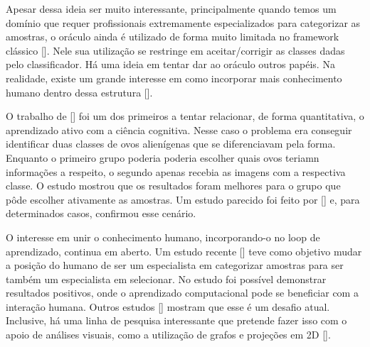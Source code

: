 Apesar dessa ideia ser muito interessante, principalmente quando temos um domínio que requer profissionais extremamente especializados para categorizar as amostras, o oráculo ainda é utilizado de forma muito limitada no framework clássico [\cite{seifert2010user}]. Nele sua utilização se restringe em aceitar/corrigir as classes dadas pelo classificador. Há uma ideia em tentar dar ao oráculo outros papéis. Na realidade, existe um grande interesse em como incorporar mais conhecimento humano dentro dessa estrutura [\cite{settles2014active}]. 

O trabalho de [\cite{castro2009human}] foi um dos primeiros a tentar relacionar, de forma quantitativa, o aprendizado ativo com a ciência cognitiva. Nesse caso o problema era conseguir identificar duas classes de ovos alienígenas que se diferenciavam pela forma. Enquanto o primeiro grupo poderia poderia escolher quais ovos teriamn  informações a respeito, o segundo apenas recebia as imagens com a respectiva classe. O estudo mostrou que os resultados foram melhores para o grupo que pôde escolher ativamente as amostras. Um estudo parecido foi feito por [\cite{markant2014better}] e, para determinados casos, confirmou esse cenário. 

O interesse em unir o conhecimento humano, incorporando-o no loop de aprendizado, continua em aberto. Um estudo recente [\cite{kottke2018other}] teve como objetivo mudar a posição do humano de ser um especialista em categorizar amostras para ser também um especialista em selecionar. No estudo foi possível demonstrar resultados positivos, onde o aprendizado computacional pode se beneficiar com a interação humana. Outros estudos [\cite{calma2016active}] mostram que esse é um desafio atual. Inclusive, há uma linha de pesquisa interessante que pretende fazer isso com o apoio de análises visuais, como a utilização de grafos e projeções em 2D [\cite{yang2018visually, bernard2018comparing, weigl2016mapview}].


